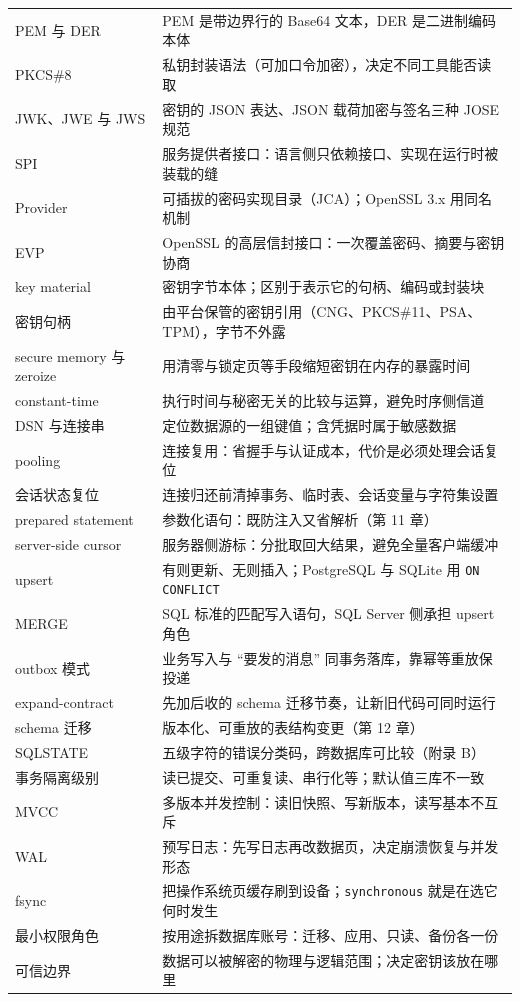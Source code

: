 \documentclass[12pt,a4paper,fontset=fandol]{ctexbook}
\newcommand{\Tp}[1]{\texttt{#1}}
\begin{document}
\begin{footnotesize}
\begin{longtable}{@{}>{\raggedright\arraybackslash}p{}
                  >{\raggedright\arraybackslash}p{}@{}}
PEM 与 DER & PEM 是带边界行的 Base64 文本，DER 是二进制编码本体 \\
PKCS\#8 & 私钥封装语法（可加口令加密），决定不同工具能否读取 \\
JWK、JWE 与 JWS & 密钥的 JSON 表达、JSON 载荷加密与签名三种 JOSE 规范 \\
SPI & 服务提供者接口：语言侧只依赖接口、实现在运行时被装载的缝 \\
Provider & 可插拔的密码实现目录（JCA）；OpenSSL 3.x 用同名机制 \\
EVP & OpenSSL 的高层信封接口：一次覆盖密码、摘要与密钥协商 \\
key material & 密钥字节本体；区别于表示它的句柄、编码或封装块 \\
密钥句柄 & 由平台保管的密钥引用（CNG、PKCS\#11、PSA、TPM），字节不外露 \\
secure memory 与 zeroize & 用清零与锁定页等手段缩短密钥在内存的暴露时间 \\
constant-time & 执行时间与秘密无关的比较与运算，避免时序侧信道 \\
DSN 与连接串 & 定位数据源的一组键值；含凭据时属于敏感数据 \\
pooling & 连接复用：省握手与认证成本，代价是必须处理会话复位 \\
会话状态复位 & 连接归还前清掉事务、临时表、会话变量与字符集设置 \\
prepared statement & 参数化语句：既防注入又省解析（第 11 章） \\
server-side cursor & 服务器侧游标：分批取回大结果，避免全量客户端缓冲 \\
upsert & 有则更新、无则插入；PostgreSQL 与 SQLite 用 \Tp{ON CONFLICT} \\
MERGE & SQL 标准的匹配写入语句，SQL Server 侧承担 upsert 角色 \\
outbox 模式 & 业务写入与 ``要发的消息'' 同事务落库，靠幂等重放保投递 \\
expand-contract & 先加后收的 schema 迁移节奏，让新旧代码可同时运行 \\
schema 迁移 & 版本化、可重放的表结构变更（第 12 章） \\
SQLSTATE & 五级字符的错误分类码，跨数据库可比较（附录 B） \\
事务隔离级别 & 读已提交、可重复读、串行化等；默认值三库不一致 \\
MVCC & 多版本并发控制：读旧快照、写新版本，读写基本不互斥 \\
WAL & 预写日志：先写日志再改数据页，决定崩溃恢复与并发形态 \\
fsync & 把操作系统页缓存刷到设备；\Tp{synchronous} 就是在选它何时发生 \\
最小权限角色 & 按用途拆数据库账号：迁移、应用、只读、备份各一份 \\
可信边界 & 数据可以被解密的物理与逻辑范围；决定密钥该放在哪里 \\
\bottomrule
\end{longtable}
\end{footnotesize}
\end{document}
